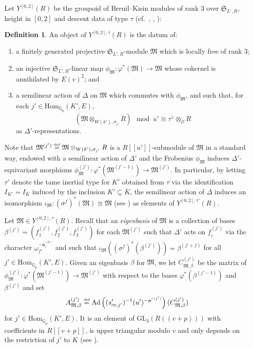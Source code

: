 \documentclass[oneside,a4paper,english, 11pt]{amsart}
\theoremstyle{plain}
\theoremstyle{plain}
\theoremstyle{plain}
\theoremstyle{plain}
\theoremstyle{plain}
\theoremstyle{plain}
\theoremstyle{definition}
\newtheorem{defn}[thm]{Definition}
\theoremstyle{definition}
\theoremstyle{definition}
\theoremstyle{remark}
\numberwithin{equation}{section}
\newcommand{\Qp}{\mathbb{Q}_p}
\newcommand{\fM}{\mathfrak{M}}
\newcommand{\fS}{\mathfrak{S}}
\newcommand{\cO}{\mathcal{O}}
\newcommand{\phz}{\varphi}
\newcommand{\Hom}{\mathrm{Hom}}
\newcommand{\GL}{\mathrm{GL}}
\renewcommand{\bf}[1]{\mathbf{#1}}
\newcommand{\orient}{\mathrm{or}}
\newcommand{\defeq}{\stackrel{\textrm{\tiny{def}}}{=}}
\newcommand{\ovl}[1]{\overline{#1}}
\DeclareMathOperator{\Ad}{Ad}
\newcommand{\ra}{\rightarrow}
\begin{document}
Let $Y^{[0, 2]}(R)$ be the groupoid of Breuil--Kisin modules of rank $3$ over $\fS_{L', R}$, height in $[0,2]$ and descent data of type $\tau$ (cf.~\cite[\S 3]{CL}, \cite[Definition 3.1.3]{LLLM2}, \cite[Definition 5.1.3]{MLM}):
\begin{defn}
An object of $Y^{[0, 2],\tau}(R)$ is the datum of:
\begin{enumerate} 
\item  a finitely generated projective $\fS_{L', R}$-module $\fM$ which is locally free of rank $3$;
\item an injective $\fS_{L', R}$-linear map $\phi_\fM:\phz^*(\fM)\ra\fM$ whose cokernel is annihilated by $E(v)^2$; and
\item a semilinear action of $\Delta$ on $\fM$ which commutes with $\phi_{\fM}$, and such that, for each $j' \in \Hom_{\Qp}(K',E)$, 
\[
(\fM\otimes_{W(k'),\sigma_{j'}}R) \mod u' \cong \tau^{\vee} \otimes_{\cO} R 
\]  
as $\Delta'$-representations.
%
\end{enumerate}
\end{defn}
Note that $\fM^{(j')}\defeq \fM\otimes_{W(k'),\sigma_{j'}}R$ is a $R[\![u']\!]$-submodule of $\fM$ in a standard way, endowed with a semilinear action of $\Delta'$ and the Frobenius $\phi_{\fM}$ induces $\Delta'$-equivariant morphisms $\phi_\fM^{(j')}:\phz^*(\fM^{(j'-1)})\ra \fM^{(j')}$.    
In particular, by letting $\tau'$ denote the tame inertial type for $K'$ obtained from $\tau$ via the identification $I_{K'}=I_K$ induced by the inclusion $K'\subseteq \ovl{K}$, the semilinear action of $\Delta$ induces an isomorphism $\iota_{\fM}:(\sigma^f)^*(\fM) \cong \fM$ (see \cite[\S 6.1]{LLLM}) as elements of $Y^{[0,2], \tau'}(R)$.

Let $\fM \in Y^{[0, 2], \tau}(R)$.
Recall that an \emph{eigenbasis} of $\fM$ is a collection of bases ${\beta}^{(j')}=(f_1^{(j')},f_2^{(j')},f_3^{(j')})$ for each $\fM^{(j')}$ such that $\Delta'$ acts on $f_i^{(j')}$ via the character $\omega_{f'}^{-\mathbf{a}^{(0)}_{i}}$ and such that $\iota_{\fM} ((\sigma^f)^*(\beta^{(j')})) = \beta^{(j' + f)}$ for all $j'\in \Hom_{\Qp}(K',E)$.
Given an eigenbasis $\beta$ for $\fM$, we let $C^{(j')}_{\fM, \beta}$ be the matrix of $\phi_\fM^{(j')}:\phz^*(\fM^{(j' - 1)})\ra \fM^{(j')}$ with respect to the bases $\phz^*(\beta^{(j'-1)})$ and $\beta^{(j')}$ and set
\[
A^{(j')}_{\fM,\beta}\defeq 
\Ad\left(
(s'_{\orient,j'})^{-1}  (u^{\prime})^{-\bf{a}^{\prime\,(j')}}
\right)(C^{(j')}_{\fM,\beta})
\]
for $j'\in \Hom_{\Qp}(K',E)$.
It is an element of $\GL_3(R(\!(v+p)\!))$ with coefficients in $R[\![v+p]\!]$, is upper triangular modulo $v$ and only depends on the restriction of $j'$ to $K$ (see \cite[\S 5.1]{MLM}).
%
%
\end{document}
